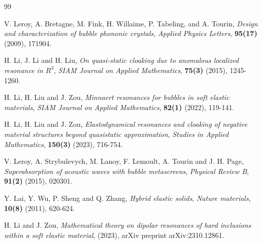 \documentclass[11pt,reqno,twoside]{amsart}
\theoremstyle{definition}
\theoremstyle{remark}
\numberwithin{equation}{section}
\begin{document}
\begin{thebibliography}{99}
	
	
	
	 V. Leroy, A. Bretagne, M. Fink, H. Willaime, P. Tabeling, and A. Tourin, {\it Design and characterization of bubble phononic crystals}, {\em Applied Physics Letters}, {\bf 95(17)} (2009), 171904.
	 

	
	

	
	
	
	H. Li, J. Li and H. Liu, {\it On quasi-static cloaking due to anomalous localized resonance in $R^3$}, {\em SIAM Journal on Applied Mathematics}, {\bf 75(3)} (2015), 1245-1260.
	
	
	
	H. Li, H. Liu and J. Zou, {\it Minnaert resonances for bubbles in soft elastic materials}, {\em SIAM Journal on Applied Mathematics}, {\bf 82(1)} (2022), 119-141.
	
	H. Li, H. Liu and J. Zou, {\it Elastodynamical resonances and cloaking of negative material structures beyond quasistatic approximation}, {\em Studies in Applied Mathematics}, {\bf 150(3)} (2023), 716-754.
	
	V. Leroy, A. Strybulevych, M. Lanoy, F. Lemoult, A. Tourin and J. H. Page,   {\it Superabsorption of acoustic waves with bubble metascreens}, {\em Physical Review B}, {\bf 91(2)} (2015), 020301.
	
	Y. Lai, Y. Wu, P. Sheng and Q. Zhang, {\it Hybrid elastic solids}, {\em Nature materials}, {\bf 10(8)} (2011), 620-624.
	
	H. Li and J. Zou,  {\it Mathematical theory on dipolar resonances of hard inclusions within a soft elastic material}, (2023), arXiv preprint arXiv:2310.12861.
	

\end{thebibliography}
\end{document}

